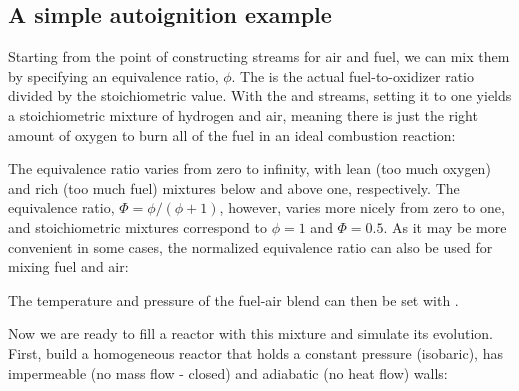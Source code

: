 \documentclass[letterpaper,10pt,english]{sphinxmanual}
\begin{document}
\subsection{A simple autoignition example}
\label{\detokenize{combustion:a-simple-autoignition-example}}
Starting from the point of constructing streams for air and fuel, we can mix them by specifying an equivalence ratio, \(\phi\).
The  is the actual fuel-to-oxidizer ratio divided by the stoichiometric value.
With the  and  streams, setting it to one yields a stoichiometric mixture of hydrogen and air,
meaning there is just the right amount of oxygen to burn all of the fuel in an ideal combustion reaction:

\begin{sphinxVerbatim}[commandchars=\\\{\}]
    
\end{sphinxVerbatim}

The equivalence ratio varies from zero to infinity, with lean (too much oxygen) and rich (too much fuel) mixtures below and above one, respectively.
The  equivalence ratio, \(\Phi=\phi/(\phi+1)\), however, varies more nicely from zero to one, and stoichiometric mixtures correspond to \(\phi=1\) and \(\Phi=0.5\).
As it may be more convenient in some cases, the normalized equivalence ratio can also be used for mixing fuel and air:

\begin{sphinxVerbatim}[commandchars=\\\{\}]
    
\end{sphinxVerbatim}

The temperature and pressure of the fuel-air blend can then be set with .

Now we are ready to fill a reactor with this mixture and simulate its evolution.
First, build a homogeneous reactor that holds a constant pressure (isobaric), has impermeable (no mass flow - closed) and adiabatic (no heat flow) walls:
\end{document}
